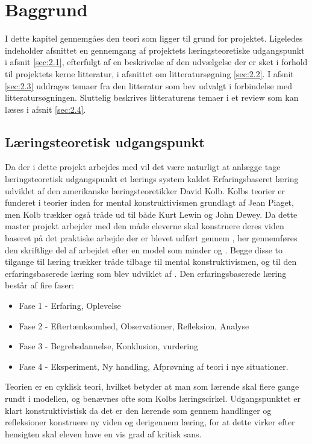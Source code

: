 \chapter{Baggrund}
\label{Ch:2}

I dette kapitel gennemgåes den teori som ligger til grund for projektet. Ligeledes indeholder afsnittet en gennemgang af projektets læringsteoretiske udgangspunkt i afsnit \vref{sec:2.1}, efterfulgt af en beskrivelse af den udvælgelse der er sket i forhold til projektets kerne litteratur, i afsnittet om litteratursøgning \vref{sec:2.2}. I afsnit \vref{sec:2.3} uddrages temaer fra den litteratur som bev udvalgt i forbindelse med litteratursøgningen. Sluttelig beskrives litteraturens temaer i et review som kan læses i afsnit \vref{sec:2.4}.


\section{Læringsteoretisk udgangspunkt}
\label{sec:2.1}
Da der i dette projekt arbejdes med \ib{} vil det være naturligt at anlægge tage læringsteoretisk udgangspunkt et lærings system kaldet Erfaringsbaseret læring udviklet af den amerikanske læringsteoretikker David Kolb. Kolbs teorier er funderet i teorier inden for mental konstruktivismen grundlagt af Jean Piaget, men Kolb trækker også tråde ud til både Kurt Lewin og John Dewey. Da dette master projekt arbejder med den måde eleverne skal konstruere deres viden baseret på det praktiske arbejde der er blevet udført gennem \ib{}, her gennemføres den skriftlige del af arbejdet efter en model som minder og \sw{}. Begge disse to tilgange til læring trækker tråde tilbage til mental konstruktivismen, og til den erfaringsbaserede læring som blev udviklet af \citep{Kolb1984}.
Den erfaringsbaserede læring består af fire faser:
\begin{itemize}
	\item Fase 1 - Erfaring, Oplevelse\vspace{-10pt}
	\item Fase 2 - Eftertænksomhed, Observationer, Refleksion, Analyse\vspace{-10pt}
	\item Fase 3 - Begrebsdannelse, Konklusion, vurdering\vspace{-10pt}
	\item Fase 4 - Eksperiment, Ny handling, Afprøvning af teori i nye situationer.
\end{itemize}
Teorien er en cyklisk teori, hvilket betyder at man som lærende skal flere gange rundt i modellen, og benævnes ofte som Kolbs læringscirkel. Udgangspunktet er klart konstruktivistisk da det er den lærende som gennem handlinger og refleksioner konstruere ny viden og derigennem læring, for at dette virker efter hensigten skal eleven have en vis grad af kritisk sans. 

